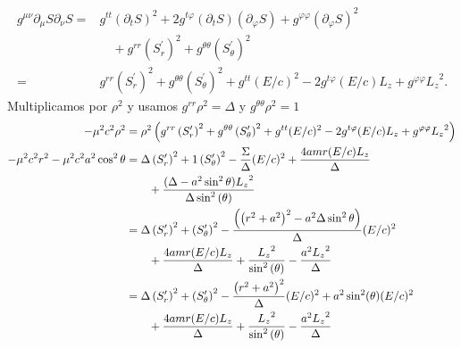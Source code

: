 \begin{equation}
    \begin{aligned}
        g^{\mu \nu} \partial_\mu S \partial_\nu S= & g^{t t}\left(\partial_t S\right)^2+2 g^{t \varphi}\left(\partial_t S\right)\left(\partial_{\varphi} S\right)+g^{\varphi \varphi}\left(\partial_{\varphi} S\right)^2 \\
                                                   & \quad +g^{r r}\left(S_r^{\prime}\right)^2+g^{\theta \theta}\left(S_\theta^{\prime}\right)^2                                                                         \\
        =                                          & g^{r r}\left(S_r^{\prime}\right)^2+g^{\theta \theta}\left(S_\theta^{\prime}\right)^2 +g^{t t} (E/c)^2-2 g^{t \varphi} (E/c) {L_z}+g^{\varphi \varphi} {L_z}^2.
    \end{aligned}
\end{equation}
Multiplicamos por $\rho^2$ y usamos $g^{r r} \rho^2=\Delta$ y $g^{\theta \theta} \rho^2=1$
\begin{equation}
    \begin{aligned}
        -\mu^2 c^2 \rho^2                           & =\rho^2 \left(g^{r r}\left(S_r^{\prime}\right)^2+g^{\theta \theta}\left(S_\theta^{\prime}\right)^2 +g^{t t} (E/c)^2-2 g^{t \varphi} (E/c) {L_z}+g^{\varphi \varphi} {L_z}^2\right) \\
        -\mu^2 c^2 r^2-\mu^2 c^2 a^2 \cos ^2 \theta & = \Delta \left(S_r^{\prime}\right)^2+1\left(S_\theta^{\prime}\right)^2  - \frac{\Sigma}{\Delta}(E/c)^2+\frac{4 a m r (E/c){L_z}}{\Delta }                                          \\
                                                    & \qquad+ \frac{ (\Delta-a^2 \sin ^2 \theta){L_z}^2 }{\Delta  \sin^{2}{\left(\theta \right)}}                                                                              \\
                                                    & = \Delta \left(S_r^{\prime}\right)^2+\left(S_\theta^{\prime}\right)^2  - \frac{\left(\left(r^2+a^2\right)^2-a^2 \Delta \sin ^2 \theta \right)}{\Delta}(E/c)^2            \\
                                                    & \qquad+\frac{4 a m r (E/c){L_z}}{\Delta }  + \frac{{L_z}^2}{\sin^{2}{\left(\theta \right)}} - \frac{a^2 {L_z}^2}{\Delta}                                                                 \\
                                                    & = \Delta \left(S_r^{\prime}\right)^2+\left(S_\theta^{\prime}\right)^2  - \frac{\left(r^2+a^2\right)^2}{\Delta}(E/c)^2 +a^2  \sin ^2 (\theta)(E/c)^2                          \\
                                                    & \qquad+\frac{4 a m r (E/c){L_z}}{\Delta }  + \frac{{L_z}^2}{\sin^{2}{\left(\theta \right)}} - \frac{a^2 {L_z}^2}{\Delta}                                                                 \\
    \end{aligned}
\end{equation}
